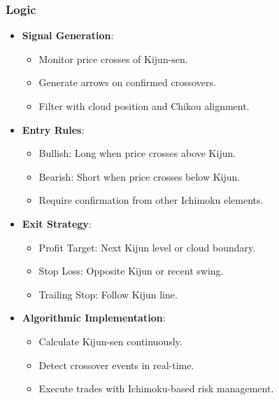 \documentclass[12pt]{article}
\begin{document}
\subsubsection{Logic}
\begin{itemize}
\item \textbf{Signal Generation}:
  \begin{itemize}
  \item Monitor price crosses of Kijun-sen.
  \item Generate arrows on confirmed crossovers.
  \item Filter with cloud position and Chikou alignment.
  \end{itemize}
\item \textbf{Entry Rules}:
  \begin{itemize}
  \item Bullish: Long when price crosses above Kijun.
  \item Bearish: Short when price crosses below Kijun.
  \item Require confirmation from other Ichimoku elements.
  \end{itemize}
\item \textbf{Exit Strategy}:
  \begin{itemize}
  \item Profit Target: Next Kijun level or cloud boundary.
  \item Stop Loss: Opposite Kijun or recent swing.
  \item Trailing Stop: Follow Kijun line.
  \end{itemize}
\item \textbf{Algorithmic Implementation}:
  \begin{itemize}
  \item Calculate Kijun-sen continuously.
  \item Detect crossover events in real-time.
  \item Execute trades with Ichimoku-based risk management.
  \end{itemize}
\end{itemize}
\end{document}
